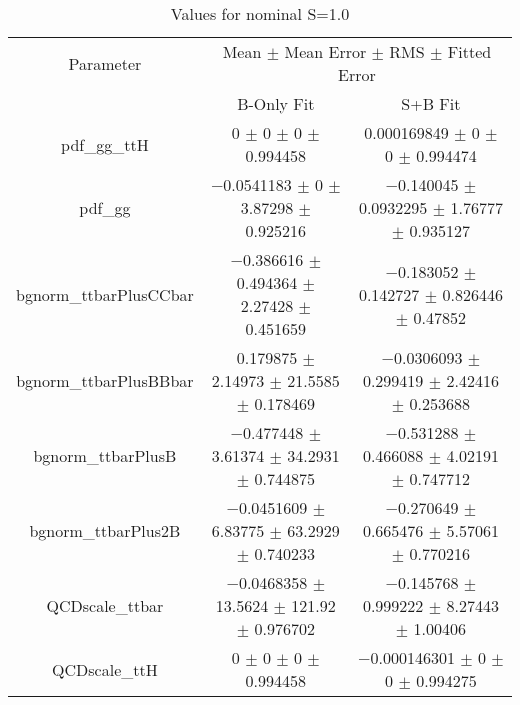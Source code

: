 \begin{table}
\centering
\caption{Values for nominal S=1.0}
\begin{tabular}{ccc}
\toprule
Parameter & \multicolumn{2}{c}{Mean $\pm$ Mean Error $\pm$ RMS $\pm$ Fitted Error}\\
 & B-Only Fit & S+B Fit\\
\midrule
pdf\_gg\_ttH & \num{0} $\pm$ \num{0} $\pm$ \num{0} $\pm$ \num{0.994458} & \num{0.000169849} $\pm$ \num{0} $\pm$ \num{0} $\pm$ \num{0.994474}\\
pdf\_gg & \num{-0.0541183} $\pm$ \num{0} $\pm$ \num{3.87298} $\pm$ \num{0.925216} & \num{-0.140045} $\pm$ \num{0.0932295} $\pm$ \num{1.76777} $\pm$ \num{0.935127}\\
bgnorm\_ttbarPlusCCbar & \num{-0.386616} $\pm$ \num{0.494364} $\pm$ \num{2.27428} $\pm$ \num{0.451659} & \num{-0.183052} $\pm$ \num{0.142727} $\pm$ \num{0.826446} $\pm$ \num{0.47852}\\
bgnorm\_ttbarPlusBBbar & \num{0.179875} $\pm$ \num{2.14973} $\pm$ \num{21.5585} $\pm$ \num{0.178469} & \num{-0.0306093} $\pm$ \num{0.299419} $\pm$ \num{2.42416} $\pm$ \num{0.253688}\\
bgnorm\_ttbarPlusB & \num{-0.477448} $\pm$ \num{3.61374} $\pm$ \num{34.2931} $\pm$ \num{0.744875} & \num{-0.531288} $\pm$ \num{0.466088} $\pm$ \num{4.02191} $\pm$ \num{0.747712}\\
bgnorm\_ttbarPlus2B & \num{-0.0451609} $\pm$ \num{6.83775} $\pm$ \num{63.2929} $\pm$ \num{0.740233} & \num{-0.270649} $\pm$ \num{0.665476} $\pm$ \num{5.57061} $\pm$ \num{0.770216}\\
QCDscale\_ttbar & \num{-0.0468358} $\pm$ \num{13.5624} $\pm$ \num{121.92} $\pm$ \num{0.976702} & \num{-0.145768} $\pm$ \num{0.999222} $\pm$ \num{8.27443} $\pm$ \num{1.00406}\\
QCDscale\_ttH & \num{0} $\pm$ \num{0} $\pm$ \num{0} $\pm$ \num{0.994458} & \num{-0.000146301} $\pm$ \num{0} $\pm$ \num{0} $\pm$ \num{0.994275}\\
\bottomrule
\end{tabular}
\end{table}